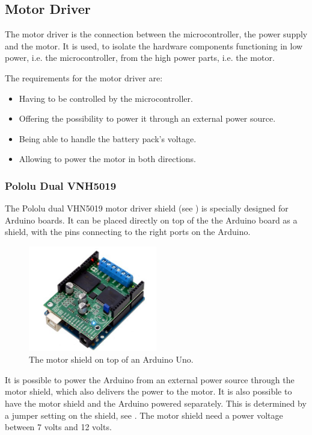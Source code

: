 \subsection{Motor Driver}
The motor driver is the connection between the microcontroller, the power supply and the motor. It is used, to isolate the hardware components functioning in low power, i.e. the microcontroller, from the high power parts, i.e. the motor.

The requirements for the motor driver are:
\begin{itemize}
\item Having to be controlled by the microcontroller.
\item Offering the possibility to power it through an external power source.
\item Being able to handle the battery pack's voltage.
\item Allowing to power the motor in both directions.
\end{itemize}

\subsubsection{Pololu Dual VNH5019}
The Pololu dual VHN5019 motor driver shield (see ) is specially designed for Arduino boards. It can be placed directly on top of the the Arduino board as a shield, with the pins connecting to the right ports on the Arduino.\cite{PCorporation}

\begin{figure}[H]
	\centering
	\includegraphics[width=0.50\textwidth]{figures/Motordriver.png}
		\caption{The motor shield on top of an Arduino Uno.\cite{DriverShield}} 
	\label{MotorDrive}
\end{figure}

It is possible to power the Arduino from an external power source through the motor shield, which also delivers the power to the motor. It is also possible to have the motor shield and the Arduino powered separately. This is determined by a jumper setting on the shield, see . The motor shield need a power voltage between 7 volts and 12 volts.\cite{PCorporation}

